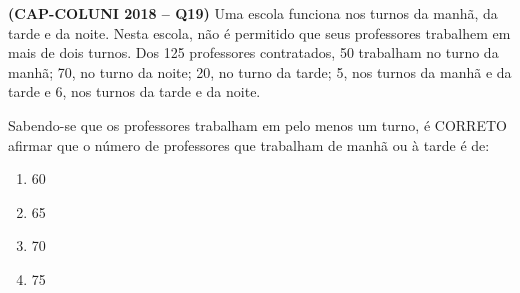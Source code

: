 \textbf{(CAP-COLUNI 2018 -- Q19)} Uma escola funciona nos turnos da manhã, da tarde e da noite. Nesta escola, não é permitido que seus professores trabalhem em mais de dois turnos. Dos 125 professores contratados, 50 trabalham no turno da manhã; 70, no turno da noite; 20, no turno da tarde; 5, nos turnos da manhã e da tarde e 6, nos turnos da tarde e da noite.

Sabendo-se que os professores trabalham em pelo menos um turno, é CORRETO afirmar que o número de professores que trabalham de manhã ou à tarde é de:

\begin{enumerate}
	\item 60
	\item 65
	\item 70
	\item 75
\end{enumerate}
